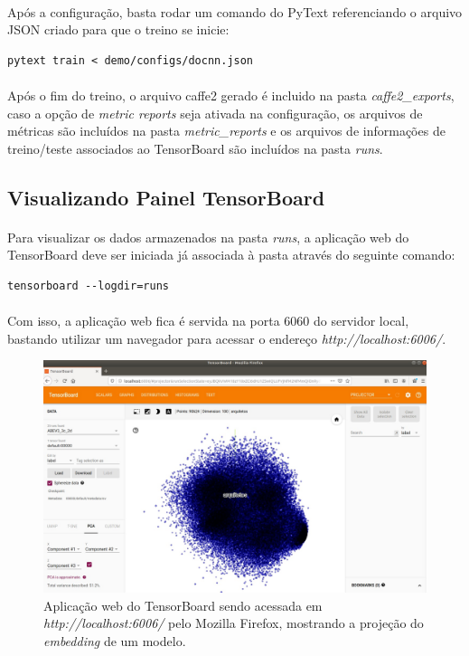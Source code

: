 \documentclass[grad,numbers]{coppe}
\begin{document}
			\paragraph{}Após a configuração, basta rodar um comando do PyText referenciando o arquivo JSON criado para que o treino se inicie:
			\begin{verbatim}
pytext train < demo/configs/docnn.json
			\end{verbatim}
			\paragraph{}Após o fim do treino, o arquivo caffe2 gerado é incluido na pasta \textit{caffe2\_exports}, caso a opção de \textit{metric reports} seja ativada na configuração, os arquivos de métricas são incluídos na pasta \textit{metric\_reports} e os arquivos de informações de treino/teste associados ao TensorBoard são incluídos na pasta \textit{runs}.
		\subsection{Visualizando Painel TensorBoard}
			\paragraph{}Para visualizar os dados armazenados na pasta \textit{runs}, a aplicação web do TensorBoard deve ser iniciada já associada à pasta através do seguinte comando:
			\begin{verbatim}
tensorboard --logdir=runs
			\end{verbatim}
			\paragraph{}Com isso, a aplicação web fica é servida na porta 6060 do servidor local, bastando utilizar um navegador para acessar o endereço \textit{http://localhost:6006/}.
 			\begin{figure}[h]
				{\includegraphics[width=15cm]{tensorboard-workinglocal.jpg}
					\caption{Aplicação web do TensorBoard sendo acessada em \textit{http://localhost:6006/} pelo Mozilla Firefox, mostrando a projeção do \textit{embedding} de um modelo.}
					\label{fig:tensorboard-workinglocal-fig}}
			\end{figure}
\end{document}
